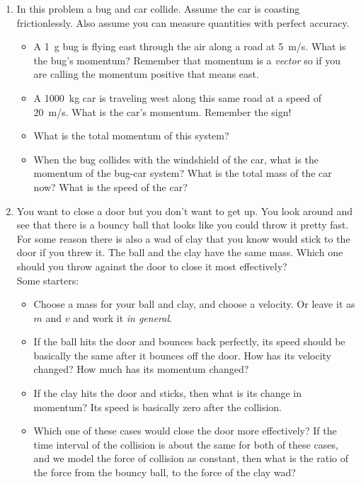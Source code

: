\begin{enumerate}
\setlength\itemsep{1 in}

\item In this problem a bug and car collide. Assume the car is coasting frictionlessly. Also assume you can measure quantities with perfect accuracy. 
\begin{itemize}
	\setlength\itemsep{1 in}
	\item A \SI{1}{\gram} bug is flying east through the air along a road at \SI{5}{m/s}. What is the bug's momentum? Remember that momentum is a \emph{vector} so if you are calling the momentum positive that means east.
	\item A \SI{1000}{kg} car is traveling west along this same road at a speed of \SI{20}{m/s}. What is the car's momentum. Remember the sign!
	\item What is the total momentum of this system?
	\item When the bug collides with the windshield of the car, what is the momentum of the bug-car system? What is the total mass of the car now? What is the speed of the car?
\end{itemize}



\item You want to close a door but you don't want to get up. You look around and see that there is a bouncy ball that looks like you could throw it pretty fast. For some reason there is also a wad of clay that you know would stick to the door if you threw it. The ball and the clay have the same mass. Which one should you throw against the door to close it most effectively?\\
Some starters:
\begin{itemize}
	\item Choose a mass for your ball and clay, and choose a velocity. Or leave it as $m$ and $v$ and work it \emph{in general}.
	\item If the ball hits the door and bounces back perfectly, its speed should be basically the same after it bounces off the door. How has its velocity changed? How much has its momentum changed?\bigskip
	\item If the clay hits the door and sticks, then what is its change in momentum? Its speed is basically zero after the collision.\bigskip
	\item Which one of these cases would close the door more effectively? If the time interval of the collision is about the same for both of these cases, and we model the force of collision as constant, then what is the ratio of the force from the bouncy ball, to the force of the clay wad?
\end{itemize}



\end{enumerate}
